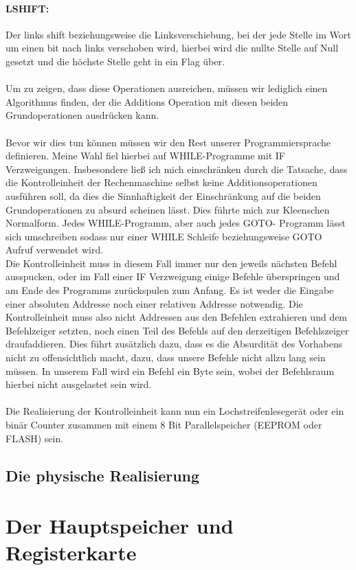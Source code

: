 \documentclass[11pt,a4paper,leqno]{report}
\numberwithin{equation}{chapter}
\begin{document}
\paragraph{LSHIFT:} Der links shift beziehungsweise die Linksverschiebung, bei der jede Stelle im Wort um einen bit nach links verschoben wird, hierbei wird die nullte Stelle auf Null gesetzt und die höchste Stelle geht in ein Flag über.\\
\\
Um zu zeigen, dass diese Operationen ausreichen, müssen wir lediglich einen Algorithmus finden, der die Additions Operation mit diesen beiden Grundoperationen ausdrücken kann.
\\
\\
Bevor wir dies tun können müssen wir den Rest unserer Programmiersprache definieren. Meine Wahl fiel hierbei auf WHILE-Programme mit IF Verzweigungen. Insbesondere ließ ich mich einschränken durch die Tatsache, dass die Kontrolleinheit der Rechenmaschine selbst keine Additionsoperationen ausführen soll, da dies die Sinnhaftigkeit der Einschränkung auf die beiden Grundoperationen zu absurd scheinen lässt. Dies führte mich zur Kleenschen Normalform. Jedes WHILE-Programm, aber auch jedes GOTO- Programm lässt sich umschreiben sodass nur einer WHILE Schleife beziehungsweise GOTO Aufruf verwendet wird.\\
Die Kontrolleinheit muss in diesem Fall immer nur den jeweils nächsten Befehl ausspucken, oder im Fall einer IF Verzweigung einige Befehle überspringen und am Ende des Programms zurückspulen zum Anfang. Es ist weder die Eingabe einer absoluten Addresse noch einer relativen Addresse notwendig. Die Kontrolleinheit muss also nicht Addressen aus den Befehlen extrahieren und dem Befehlzeiger setzten, noch einen Teil des Befehls auf den derzeitigen Befehlszeiger draufaddieren. Dies führt zusätzlich dazu, dass es die Absurdität des Vorhabens nicht zu offensichtlich macht, dazu, dass unsere Befehle nicht allzu lang sein müssen. In unserem Fall wird ein Befehl ein Byte sein, wobei der Befehlsraum hierbei nicht ausgelastet sein wird.\\
\\
Die Realisierung der Kontrolleinheit kann nun ein Lochstreifenlesegerät oder ein binär Counter zusammen mit einem 8 Bit Parallelspeicher (EEPROM oder FLASH) sein.
\subsection{Die physische Realisierung}
\section{Der Hauptspeicher und Registerkarte}
\end{document}
